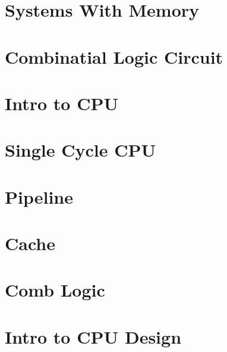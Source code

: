 \documentclass[en,11pt,english,black,simple,device=ppt]{elegantbook}
\begin{document}
\section{Systems With Memory}



\section{Combinatial Logic Circuit}





\section{Intro to CPU}




\section{Single Cycle CPU}



\section{Pipeline}





\section{Cache}



\section{Comb Logic}

 

 

\section{Intro to CPU Design}
\end{document}
